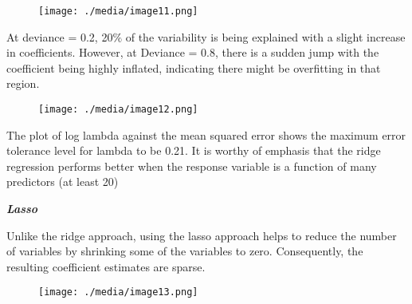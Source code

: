 \documentclass[12pt]{article}
\begin{document}

\begin{figure}[H]
	\begin{Center}
		\texttt{[image: ./media/image11.png]}
	\end{Center}
\end{figure}



\par

At deviance = 0.2, 20$\%$  of the variability is being explained with a slight increase in coefficients. However, at Deviance = 0.8, there is a sudden jump with the coefficient being highly inflated, indicating there might be overfitting in that region.\par




\begin{figure}[H]
	\begin{Center}
		\texttt{[image: ./media/image12.png]}
	\end{Center}
\end{figure}



\par

The plot of log lambda against the mean squared error shows the maximum error tolerance level for lambda to be 0.21. It is worthy of emphasis that the ridge regression performs better when the response variable is a function of many predictors (at least 20)\par

\textbf{\textit{Lasso}}\par

Unlike the ridge approach, using the lasso approach helps to reduce the number of variables by shrinking some of the variables to zero. Consequently, the resulting coefficient estimates are sparse.\par




\begin{figure}[H]
	\begin{Center}
		\texttt{[image: ./media/image13.png]}
	\end{Center}
\end{figure}
\end{document}
